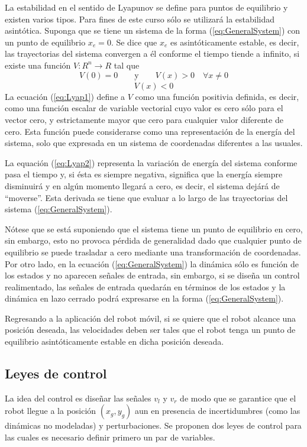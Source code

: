\documentclass[a4paper]{article}
\begin{document}
La estabilidad en el sentido de Lyapunov se define para puntos de equilibrio y existen varios tipos. Para fines de este curso sólo se utilizará la estabilidad asintótica. Suponga que se tiene un sistema de la forma (\ref{eq:GeneralSystem}) con un punto de equilibrio $x_e = 0$. Se dice que $x_e$ es asintóticamente estable, es decir, las trayectorias del sistema convergen a él conforme el tiempo tiende a infinito, si existe una función $V:R^n \rightarrow R$ tal que 
\begin{equation}
V(0) = 0 \qquad\textrm{y}\qquad V(x) > 0 \quad\forall x\neq 0 \label{eq:Lyap1}
\end{equation}
\begin{equation}
\dot{V}(x) < 0 \label{eq:Lyap2}
\end{equation}
La ecuación (\ref{eq:Lyap1}) define a $V$ como una función positivia definida, es decir, como una función escalar de variable vectorial cuyo valor es cero sólo para el vector cero, y estrictamente mayor que cero para cualquier valor diferente de cero. Esta función puede considerarse como una representación de la energía del sistema, solo que expresada en un sistema de coordenadas diferentes a las usuales. 

La equación (\ref{eq:Lyap2}) representa la variación de energía del sistema conforme pasa el tiempo y, si ésta es siempre negativa, significa que la energía siempre disminuirá y en algún momento llegará a cero, es decir, el sistema dejárá de ``moverse''. Esta derivada se tiene que evaluar a lo largo de las trayectorias del sistema (\ref{eq:GeneralSystem}). 

Nótese que se está suponiendo que el sistema tiene un punto de equilibrio en cero, sin embargo, esto no provoca pérdida de generalidad dado que cualquier punto de equilibrio se puede trasladar a cero mediante una transformación de coordenadas. Por otro lado, en la ecuación (\ref{eq:GeneralSystem}) la dinámica sólo es función de los estados y no aparecen señales de entrada, sin embargo, si se diseña un control realimentado, las señales de entrada quedarán en términos de los estados y la dinámica en lazo cerrado podrá expresarse en la forma (\ref{eq:GeneralSystem}). 

Regresando a la aplicación del robot móvil, si se quiere que el robot alcance una posición deseada, las velocidades deben ser tales que el robot tenga un punto de equilibrio asintóticamente estable en dicha posición deseada. 

\subsection{Leyes de control}
La idea del control es diseñar las señales $v_l$ y $v_r$ de modo que se garantice que el robot llegue a la posición $\left(x_g, y_g\right)$ aun en presencia de incertidumbres (como las dinámicas no modeladas) y perturbaciones. Se proponen dos leyes de control para las cuales es necesario definir primero un par de variables.
\end{document}
